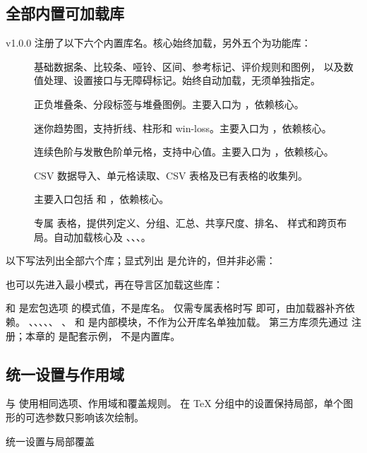 \subsection{全部内置可加载库}
v1.0.0 注册了以下六个内置库名。核心始终加载，另外五个为功能库：
\begin{description}
\item[] 基础数据条、比较条、哑铃、区间、参考标记、评价规则和图例，
以及数值处理、设置接口与无障碍标记。始终自动加载，无须单独指定。
\item[] 正负堆叠条、分段标签与堆叠图例。主要入口为 \key{\gradstack}，依赖核心。
\item[] 迷你趋势图，支持折线、柱形和 win-loss。主要入口为 \key{\gradspark}，依赖核心。
\item[] 连续色阶与发散色阶单元格，支持中心值。主要入口为 \key{\gradheat}，依赖核心。
\item[] CSV 数据导入、单元格读取、CSV 表格及已有表格的收集列。\par
主要入口包括 \key{\gradbarsloadcsv} 和 \key{\gradbarscolumn}，依赖核心。
\item[] 专属  表格，提供列定义、分组、汇总、共享尺度、排名、
样式和跨页布局。自动加载核心及 、、、。
\end{description}
以下写法列出全部六个库；显式列出  是允许的，但并非必需：
\begin{codeonly}
\usepackage[libraries={core,stack,spark,heat,csv,table}]{gradbars}
\end{codeonly}
也可以先进入最小模式，再在导言区加载这些库：
\begin{codeonly}
\usepackage[libraries=none]{gradbars}
\end{codeonly}
 和  是宏包选项  的模式值，不是库名。
仅需专属表格时写  即可，由加载器补齐依赖。
、、、、、
、 和  是内部模块，不作为公开库名单独加载。
第三方库须先通过 \key{\gradbarsdeclarelibrary} 注册；本章的  是配套示例，
不是内置库。

\subsection{统一设置与作用域}
 与  使用相同选项、作用域和覆盖规则。
在 TeX 分组中的设置保持局部，单个图形的可选参数只影响该次绘制。
\begin{example}{统一设置与局部覆盖}
{}
\end{example}
